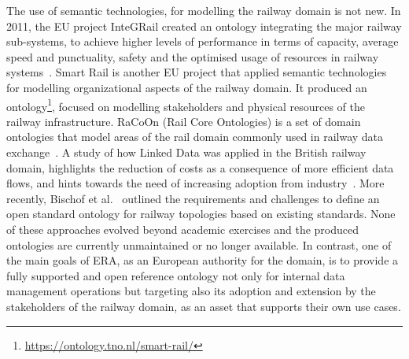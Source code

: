 The use of semantic technologies,
for modelling the railway domain is not new.
In 2011, the EU project InteGRail
created an ontology integrating the major railway sub-systems,
to achieve higher levels of performance in terms of capacity,
average speed and punctuality, safety and the optimised usage of resources
in railway systems~\cite{verstichel2011}.
Smart Rail is another EU project that applied semantic technologies
for modelling organizational aspects of the railway domain.
It produced an ontology\footnote{\url{https://ontology.tno.nl/smart-rail/}},
focused on modelling stakeholders and physical resources of the railway infrastructure.
RaCoOn (Rail Core Ontologies) is a set of domain ontologies
that model areas of the rail domain commonly used in railway data exchange~\cite{tutcher2017}.
A study of how Linked Data was applied
in the British railway domain,
highlights the reduction of costs
as a consequence of more efficient data flows,
and hints towards the need of increasing adoption from industry~\cite{morris2014}.
More recently, Bischof et al.~\cite{bischof2020} outlined
the requirements and challenges to define an open
standard ontology for railway topologies based on existing standards.
None of these approaches evolved beyond academic exercises
and the produced ontologies are currently unmaintained or no longer available.
In contrast, one of the main goals of ERA,
as an European authority for the domain,
is to provide a fully supported and open reference ontology
not only for internal data management operations
but targeting also its adoption and extension
by the stakeholders of the railway domain,
as an asset that supports their own use cases.